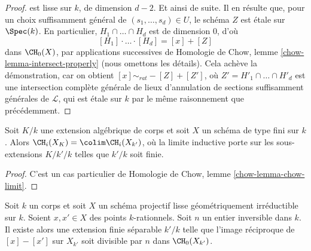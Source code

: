 \begin{proof}
est lisse sur $k$, de dimension $d - 2$. Et ainsi de suite.
Il en résulte que, pour un choix suffisamment général de
$(s_1, \ldots, s_d) \in U$, le schéma $Z$ est \'etale sur $\Spec(k)$.
En particulier, $H_1 \cap \ldots \cap H_d$ est de dimension $0$,
d'où
$$
[H_1] \cdot \ldots \cdot [H_d] = [x] + [Z]
$$
dans $\CH_0(X)$, par applications successives de
Homologie de Chow, lemme \ref{chow-lemma-intersect-properly} (nous omettons les détails).
Cela achève la démonstration, car on obtient $[x] \sim_{rat} - [Z] + [Z']$,
où $Z' = H'_1 \cap \ldots \cap H'_d$ est une intersection complète générale
de lieux d'annulation de sections suffisamment générales
de $\mathcal{L}$, qui est \'etale sur $k$ par le même
raisonnement que précédemment.
\end{proof}

\begin{lemma}
\label{lemma-chow-limit}
Soit $K/k$ une extension algébrique de corps et soit $X$ un schéma
de type fini sur $k$. Alors $\CH_i(X_K) = \colim \CH_i(X_{k'})$, où la
limite inductive porte sur les sous-extensions $K/k'/k$ telles que $k'/k$ soit finie.
\end{lemma}

\begin{proof}
C'est un cas particulier de
Homologie de Chow, lemme \ref{chow-lemma-chow-limit}.
\end{proof}

\begin{lemma}
\label{lemma-divide-difference-points}
Soit $k$ un corps et soit $X$ un schéma projectif lisse
géométriquement irréductible sur $k$. Soient $x, x' \in X$ des points $k$-rationnels.
Soit $n$ un entier inversible dans $k$.
Il existe alors une extension finie séparable $k'/k$ telle que
l'image réciproque de $[x] - [x']$ sur $X_{k'}$
soit divisible par $n$ dans $\CH_0(X_{k'})$.
\end{lemma}

